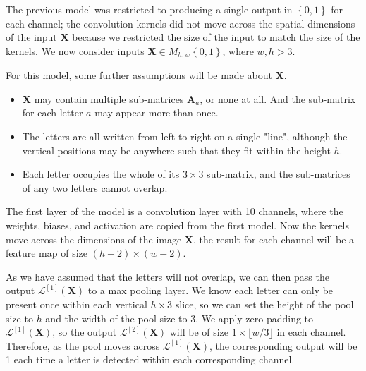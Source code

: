\documentclass{somasmsc}
\begin{document}
The previous model was restricted to producing a single output in $\left\{0,1\right\}$ for each channel; the convolution kernels did not move across the spatial dimensions of the input $\mathbf{X}$ because we restricted the size of the input to match the size of the kernels. We now consider inputs $\mathbf{X} \in M_{h,w}\left\{0,1\right\}$, where $w,h > 3$.

For this model, some further assumptions will be made about $\mathbf{X}$.
\begin{itemize}
    \item $\mathbf{X}$ may contain multiple sub-matrices $\mathbf{A}_a$, or none at all. And the sub-matrix for each letter $a$ may appear more than once.
    \item The letters are all written from left to right on a single "line", although the vertical positions may be anywhere such that they fit within the height $h$.
    \item Each letter occupies the whole of its $3 \times 3$ sub-matrix, and the sub-matrices of any two letters cannot overlap.
\end{itemize}

The first layer of the model is a convolution layer with 10 channels, where the weights, biases, and activation are copied from the first model. Now the kernels move across the dimensions of the image $\mathbf{X}$, the result for each channel will be a feature map of size $\left(h - 2\right) \times \left(w - 2\right)$.

As we have assumed that the letters will not overlap, we can then pass the output $\mathcal{L}^{\left[1\right]}\left(\mathbf{X}\right)$ to a max pooling layer. We know each letter can only be present once within each vertical $h \times 3$ slice, so we can set the height of the pool size to $h$ and the width of the pool size to 3. We apply zero padding to $\mathcal{L}^{\left[1\right]}\left(\mathbf{X}\right)$, so the output $\mathcal{L}^{\left[2\right]}\left(\mathbf{X}\right)$ will be of size $1 \times \lfloor w/3 \rfloor$ in each channel. Therefore, as the pool moves across $\mathcal{L}^{\left[1\right]}\left(\mathbf{X}\right)$, the corresponding output will be 1 each time a letter is detected within each corresponding channel.
\end{document}
